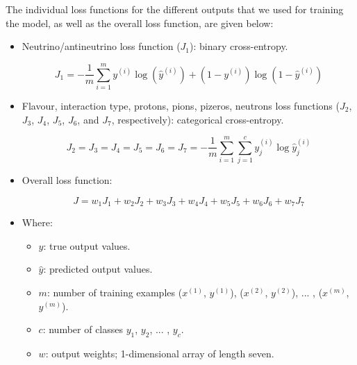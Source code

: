 The individual loss functions for the different outputs that we used for training the model, as well as the overall loss function, are given below:

\begin{itemize}
    \item Neutrino/antineutrino loss function ($J_{1}$): binary cross-entropy.

    \begin{equation}
    J_{1} = - \frac{1} m \sum_{i=1}^{m} y^{(i)} \log (\hat{y}^{(i)}) + (1 - y^{(i)}) \log (1 -\hat{y}^{(i)})
    \end{equation}

    \item Flavour, interaction type, protons, pions, pizeros, neutrons loss functions ($J_{2}$, $J_{3}$, $J_{4}$, $J_{5}$, $J_{6}$, and $J_{7}$, respectively): categorical cross-entropy.

    \begin{equation}
    J_{2} = J_{3} = J_{4} = J_{5} = J_{6} = J_{7} = - \frac{1} m \sum_{i=1}^{m} \sum_{j=1}^{c} y_{j}^{(i)} \log \hat{y}_{j}^{(i)}
    \end{equation}

    \item Overall loss function:

    \begin{equation}
    J = w_{1} J_{1} + w_{2} J_{2} + w_{3} J_{3} + w_{4} J_{4} + w_{5} J_{5} + w_{6} J_{6} + w_{7} J_{7}
    \end{equation}

    \item Where:
        \begin{itemize}
        \item $y$: true output values.
        \item $\hat{y}$: predicted output values.
\item $m$: number of training examples ($x^{(1)}$, $y^{(1)}$), ($x^{(2)}$, $y^{(2)}$), ... , ($x^{(m)}$, $y^{(m)}$).
        \item $c$: number of classes $y_{1}$, $y_{2}$, ... , $y_{c}$.
        \item $w$: output weights; 1-dimensional array of length seven.
    \end{itemize}
\end{itemize}

